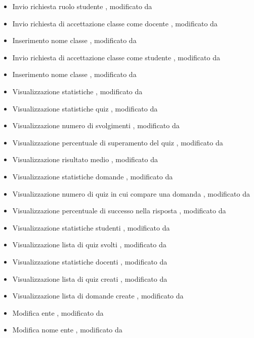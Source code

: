 \begin{itemize}
	\item {} Invio richiesta ruolo studente , modificato da 
	\item {} Invio richiesta di accettazione classe come docente , modificato da 
	\item {} Inserimento nome classe , modificato da 
	\item {} Invio richiesta di accettazione classe come studente , modificato da 
	\item {} Inserimento nome classe , modificato da 
	\item {} Visualizzazione statistiche , modificato da 
	\item {} Visualizzazione statistiche quiz , modificato da 
	\item {} Visualizzazione numero di svolgimenti , modificato da 
	\item {} Visualizzazione percentuale di superamento del quiz , modificato da 
	\item {} Visualizzazione risultato medio , modificato da 
	\item {} Visualizzazione statistiche domande , modificato da 
	\item {} Visualizzazione numero di quiz in cui compare una domanda , modificato da 
	\item {} Visualizzazione percentuale di successo nella risposta , modificato da 
	\item {} Visualizzazione statistiche studenti , modificato da 
	\item {} Visualizzazione lista di quiz svolti , modificato da 
	\item {} Visualizzazione statistiche docenti , modificato da 
	\item {} Visualizzazione lista di quiz creati , modificato da 
	\item {} Visualizzazione lista di domande create , modificato da 
	\item {} Modifica ente , modificato da 
	\item {} Modifica nome ente , modificato da 

\end{itemize}
